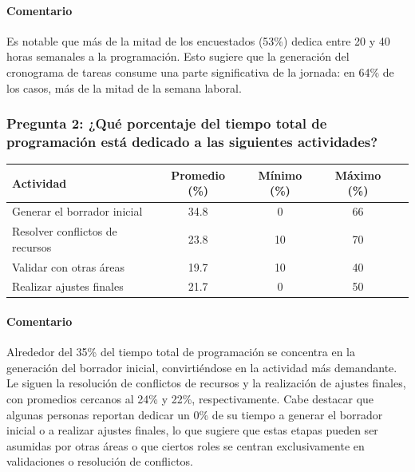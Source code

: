 \documentclass{article}
\begin{document}
\begin{appendix}
    \paragraph{Comentario} Es notable que más de la mitad de los encuestados (53\%) dedica entre 20 y 40 horas semanales a la programación. Esto sugiere que la generación del cronograma de tareas consume una parte significativa de la jornada: en 64\% de los casos, más de la mitad de la semana laboral.
    
    
    \vspace{1.5em}
    \subsubsection*{Pregunta 2: ¿Qué porcentaje del tiempo total de programación está dedicado a las siguientes actividades?}
    \vspace{.5em}
    
    \begin{table}[htbp]
        \centering
        \begin{tabular}{lccc c}
            \toprule
            \textbf{Actividad} & \textbf{Promedio (\%)} & \textbf{Mínimo (\%)} & \textbf{Máximo (\%)} \\
            \midrule
            Generar el borrador inicial & 34.8 & 0 & 66\\
            Resolver conflictos de recursos & 23.8 & 10 & 70\\
            Validar con otras áreas & 19.7 & 10 & 40\\
            Realizar ajustes finales & 21.7 & 0 & 50\\
            \bottomrule
        \end{tabular}
        \label{tab:distribucion_actividades}
    \end{table}
    
    \paragraph{Comentario} Alrededor del 35\% del tiempo total de programación se concentra en la generación del borrador inicial, convirtiéndose en la actividad más demandante. Le siguen la resolución de conflictos de recursos y la realización de ajustes finales, con promedios cercanos al 24\% y 22\%, respectivamente. Cabe destacar que algunas personas reportan dedicar un 0\% de su tiempo a generar el borrador inicial o a realizar ajustes finales, lo que sugiere que estas etapas pueden ser asumidas por otras áreas o que ciertos roles se centran exclusivamente en validaciones o resolución de conflictos.
    

\end{appendix}
\end{document}
